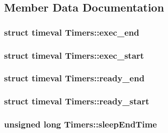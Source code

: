 \subsection{Member Data Documentation}
\hypertarget{structTimers_abafe60fb86d74d40dfdc90a423743e08}{
\subsubsection[{exec\-\_\-end}]{\setlength{\rightskip}{0pt plus 5cm}struct timeval Timers\-::exec\-\_\-end}}\label{structTimers_abafe60fb86d74d40dfdc90a423743e08}
\hypertarget{structTimers_ab20639ab87d42a43d5ab679070ae6625}{
\subsubsection[{exec\-\_\-start}]{\setlength{\rightskip}{0pt plus 5cm}struct timeval Timers\-::exec\-\_\-start}}\label{structTimers_ab20639ab87d42a43d5ab679070ae6625}
\hypertarget{structTimers_a0987d235d4c34273d27c350888bd1173}{
\subsubsection[{ready\-\_\-end}]{\setlength{\rightskip}{0pt plus 5cm}struct timeval Timers\-::ready\-\_\-end}}\label{structTimers_a0987d235d4c34273d27c350888bd1173}
\hypertarget{structTimers_a3f10bbafe694876f448cd427ccd6724b}{
\subsubsection[{ready\-\_\-start}]{\setlength{\rightskip}{0pt plus 5cm}struct timeval Timers\-::ready\-\_\-start}}\label{structTimers_a3f10bbafe694876f448cd427ccd6724b}
\hypertarget{structTimers_ad9992f03cf5ba592d57291a9624ad5e7}{
\subsubsection[{sleep\-End\-Time}]{\setlength{\rightskip}{0pt plus 5cm}unsigned long Timers\-::sleep\-End\-Time}}\label{structTimers_ad9992f03cf5ba592d57291a9624ad5e7}
